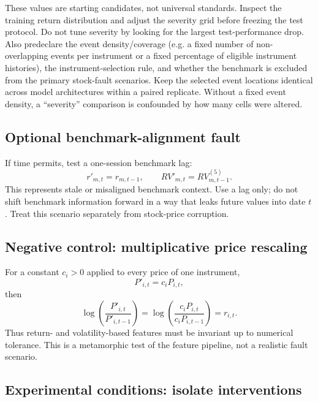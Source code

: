 \documentclass[11pt,a4paper]{article}
\begin{document}
These values are starting candidates, not universal standards. Inspect the training return distribution and adjust the severity grid before freezing the test protocol. Do not tune severity by looking for the largest test-performance drop. Also predeclare the event density/coverage (e.g. a fixed number of non-overlapping events per instrument or a fixed percentage of eligible instrument histories), the instrument-selection rule, and whether the benchmark is excluded from the primary stock-fault scenarios. Keep the selected event locations identical across model architectures within a paired replicate. Without a fixed event density, a ``severity'' comparison is confounded by how many cells were altered.

\subsection{Optional benchmark-alignment fault}

If time permits, test a one-session benchmark lag:
\begin{equation}
  r'_{m,t}=r_{m,t-1},\qquad
  RV'_{m,t}=RV_{m,t-1}^{(5)}.
\end{equation}
This represents stale or misaligned benchmark context. Use a lag only; do not shift benchmark information forward in a way that leaks future values into date $t$. Treat this scenario separately from stock-price corruption.

\subsection{Negative control: multiplicative price rescaling}

For a constant $c_i>0$ applied to every price of one instrument,
\begin{equation}
  P'_{i,t}=c_iP_{i,t},
\end{equation}
then
\begin{equation}
  \log\!\left(\frac{P'_{i,t}}{P'_{i,t-1}}\right)
  =\log\!\left(\frac{c_iP_{i,t}}{c_iP_{i,t-1}}\right)
  =r_{i,t}.
\end{equation}
Thus return- and volatility-based features must be invariant up to numerical tolerance. This is a metamorphic test of the feature pipeline, not a realistic fault scenario.

\subsection{Experimental conditions: isolate interventions}
\end{document}
